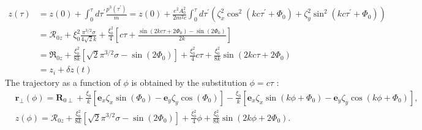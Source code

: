 \begin{align}
  z(\tau) & =z(0)+\int_{0}^{\tau} d \tau^{\prime} \frac{p^{3}\left(\tau^{\prime}\right)}{m}=z(0)+\frac{e^{2} A_{0}^{2}}{2 m^{2} c} \int_{0}^{\tau} d \tau^{\prime}\left(\zeta_{x}^{2} \cos ^{2}\left(k c \tau^{\prime}+\Phi_{0}\right)+\zeta_{y}^{2} \sin ^{2}\left(k c \tau^{\prime}+\Phi_{0}\right)\right) \\
          & =\mathcal{R}_{0 z}+\xi_{0}^{2} \frac{\pi^{3 / 2} \sigma}{4 \sqrt{2} k}+\frac{\xi_{0}^{2}}{4}\left[c \tau+\frac{\sin \left(2 k c \tau+2 \Phi_{0}\right)-\sin \left(2 \Phi_{0}\right)}{2 k}\right]                                                                                                 \\
          & =\mathfrak{R}_{0 z}+\frac{\xi_{0}^{2}}{8 k}\left[\sqrt{2} \pi^{3 / 2} \sigma-\sin \left(2 \Phi_{0}\right)\right]+\frac{\xi_{0}^{2}}{4} c \tau+\frac{\xi_{0}^{2}}{8 k} \sin \left(2 k c \tau+2 \Phi_{0}\right)                                                                                    \\
          & =z_{i}+\delta z(t) \label{II.2.4.24}
\end{align}
The trajectory as a function of $\phi$ is obtained by the substitution $\phi=c \tau$ :
\begin{align}
   & \mathbf{r}_{\perp}(\phi)=\mathbf{R}_{0 \perp}+\frac{\xi_{0}}{k}\left[\mathbf{e}_{x} \zeta_{x} \sin \left(\Phi_{0}\right)-\mathbf{e}_{y} \zeta_{y} \cos \left(\Phi_{0}\right)\right]-\frac{\xi_{0}}{k}\left[\mathbf{e}_{x} \zeta_{x} \sin \left(k \phi+\Phi_{0}\right)-\mathbf{e}_{y} \zeta_{y} \cos \left(k \phi+\Phi_{0}\right)\right],  \label{II.2.4.25} \\
   & z(\phi)=\mathcal{R}_{0 z}+\frac{\xi_{0}^{2}}{8 k}\left[\sqrt{2} \pi^{3 / 2} \sigma-\sin \left(2 \Phi_{0}\right)\right]+\frac{\xi_{0}^{2}}{4} \phi+\frac{\xi_{0}^{2}}{8 k} \sin \left(2 k \phi+2 \Phi_{0}\right) . \label{II.2.4.26}                                                                                                                         \\
\end{align}


